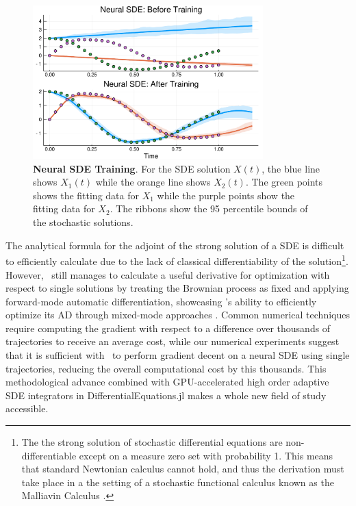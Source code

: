 \documentclass{juliacon}
\newcommand{\Zygote}{\iftoggle{anonymous}{$\partial$P.jl}{Zygote}}
\begin{document}
\begin{figure}[!htb]
  \centering\includegraphics[width=3.5in]{images/neural_sde}
  \caption{{\bf Neural SDE Training}. For the SDE solution $X(t)$, the blue line shows $X_1(t)$ while the orange line shows $X_2(t)$. The green points shows the fitting data for $X_1$ while the purple points show the fitting data for $X_2$. The ribbons show the 95 percentile bounds of the stochastic solutions.}\label{fig:neuralsde}
\end{figure}

The analytical formula for the adjoint of the strong solution of a SDE is difficult to efficiently calculate due to the lack of classical differentiability of the solution\footnote{The the strong solution of stochastic differential equations are non-differentiable except on a measure zero set with probability 1. This means that standard Newtonian calculus cannot hold, and thus the derivation must take place in a the setting of a stochastic functional calculus known as the Malliavin Calculus \cite{doi:10.1137/S0363012902419059,huang2000malliavin,zhang_2004}.}. However, \Zygote\ still manages to calculate a useful derivative for optimization with respect to single solutions by treating the Brownian process as fixed and applying forward-mode automatic differentiation, showcasing \Zygote's ability to efficiently optimize its AD through mixed-mode approaches \cite{2018arXiv181201892R}. Common numerical techniques require computing the gradient with respect to a difference over thousands of trajectories to receive an average cost, while our numerical experiments suggest that it is sufficient with \Zygote\ to perform gradient decent on a neural SDE using single trajectories, reducing the overall computational cost by this thousands. This methodological advance combined with GPU-accelerated high order adaptive SDE integrators in DifferentialEquations.jl makes a whole new field of study accessible. 
\end{document}
